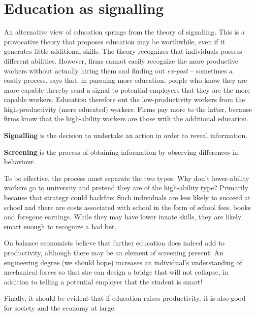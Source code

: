 \section{Education as signalling}\label{sec:ch13sec4}

An alternative view of education springs from the theory of signalling. This
is a provocative theory that proposes education may be worthwhile, even if
it generates little additional skills. The theory recognizes that
individuals possess different abilities. However, firms cannot easily
recognize the more productive workers without actually hiring them and
finding out \textit{ex-post} -- sometimes a costly process. %
 says that, in pursuing more education,
people who know they are more capable thereby send a signal to potential employers
that they are the more capable workers. Education therefore %
 out the low-productivity workers from the
high-productivity (more educated) workers. Firms pay more to the latter,
because firms know that the high-ability workers are those with the
additional education.

\begin{DefBox}
	\textbf{Signalling} is the decision to undertake an action in order to reveal information.
	
	\textbf{Screening} is the process of obtaining information by observing differences in behaviour.
\end{DefBox}

To be effective, the process must separate the two types. Why don't
lower-ability workers go to university and pretend they are of the
high-ability type? Primarily because that strategy could backfire: Such
individuals are less likely to succeed at school and there are costs
associated with school in the form of school fees, books and foregone
earnings. While they may have lower innate skills, they are likely smart
enough to recognize a bad bet.

On balance economists believe that further education does indeed add to
productivity, although there may be an element of screening present: An
engineering degree (we should hope) increases an individual's understanding
of mechanical forces so that she can design a bridge that will not collapse,
in addition to telling a potential employer that the student is smart!

Finally, it should be evident that if education raises productivity, it is
also good for society and the economy at large.